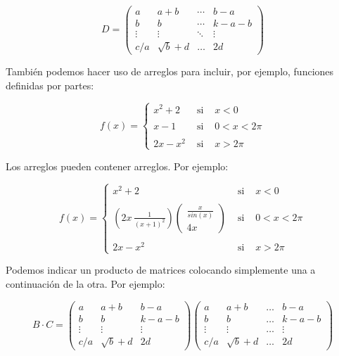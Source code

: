 \documentclass[letterpaper,12pt]{book}
\begin{document}
\[
D = \left( 
\begin{array}{lccc}
	a & a+b & \cdots & b-a \\
	b & b & \cdots & k-a-b \\
	\vdots & \vdots & \ddots & \vdots \\
	c/a & \sqrt{b} + d & \hdots & 2d
\end{array}
\right)
\]

También podemos hacer uso de arreglos para incluir, por ejemplo, funciones definidas por partes:

\[
f(x)= \left\{ 
\begin{array}{lcl}
	x^2 + 2 & \mbox{ si } & x<0 \\
	& & \\
	x-1 & \mbox{ si } & 0 < x < 2 \pi \\
	& & \\
	2 x - x^2 & \mbox{ si } & x>2 \pi
\end{array}
\right.
\]

Los arreglos pueden contener arreglos. Por ejemplo:

\[
f(x)= \left\{ 
\begin{array}{lcl}
	x^2 + 2 & \mbox{ si } & x<0 \\
	& & \\
	(2x \, \frac{1}{(x+1)^2})\left(\begin{array}{c} \frac{x}{sin(x)} \\ 4x \end{array}\right) & \mbox{ si } & 0 < x < 2 \pi \\
	& & \\
	2 x - x^2 & \mbox{ si } & x>2 \pi
\end{array}
\right.
\]

Podemos indicar un producto de matrices colocando simplemente una a continuación de la otra. Por ejemplo:

\[
B \cdot C = \left( 
\begin{array}{lcc}
	a & a+b & b-a \\
	b & b & k-a-b \\
	\vdots & \vdots & \vdots \\
	c/a & \sqrt{b} + d & 2d
\end{array}
\right)\left( 
\begin{array}{lccc}
	a & a+b & \hdots & b-a \\
	b & b & \hdots & k-a-b \\
	\vdots & \vdots & \hdots & \vdots \\
	c/a & \sqrt{b} + d & \hdots & 2d
\end{array}
\right)
\]
\end{document}
